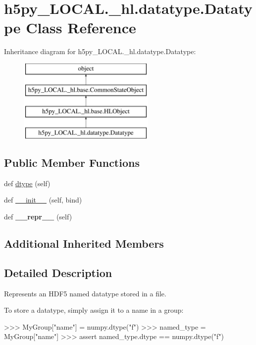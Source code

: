 \hypertarget{classh5py__LOCAL_1_1__hl_1_1datatype_1_1Datatype}{}\section{h5py\+\_\+\+L\+O\+C\+A\+L.\+\_\+hl.\+datatype.\+Datatype Class Reference}
\label{classh5py__LOCAL_1_1__hl_1_1datatype_1_1Datatype}
Inheritance diagram for h5py\+\_\+\+L\+O\+C\+A\+L.\+\_\+hl.\+datatype.\+Datatype\+:\begin{figure}[H]
\begin{center}
\leavevmode
\includegraphics[height=4.000000cm]{classh5py__LOCAL_1_1__hl_1_1datatype_1_1Datatype}
\end{center}
\end{figure}
\subsection*{Public Member Functions}
\begin{DoxyCompactItemize}
\item 
def \hyperlink{classh5py__LOCAL_1_1__hl_1_1datatype_1_1Datatype_a76f08784e54e27eac847f1b69482a93b}{dtype} (self)
\item 
def \hyperlink{classh5py__LOCAL_1_1__hl_1_1datatype_1_1Datatype_a37491aeee328996fb79fadce9c3f30bc}{\+\_\+\+\_\+init\+\_\+\+\_\+} (self, bind)
\item 
\mbox{\label{classh5py__LOCAL_1_1__hl_1_1datatype_1_1Datatype_a0595fa3982d660e1e362e8034a21cf7d}} 
def {\bfseries \+\_\+\+\_\+repr\+\_\+\+\_\+} (self)
\end{DoxyCompactItemize}
\subsection*{Additional Inherited Members}


\subsection{Detailed Description}
\begin{DoxyVerb}    Represents an HDF5 named datatype stored in a file.

    To store a datatype, simply assign it to a name in a group:

    >>> MyGroup["name"] = numpy.dtype("f")
    >>> named_type = MyGroup["name"]
    >>> assert named_type.dtype == numpy.dtype("f")
\end{DoxyVerb}
 

